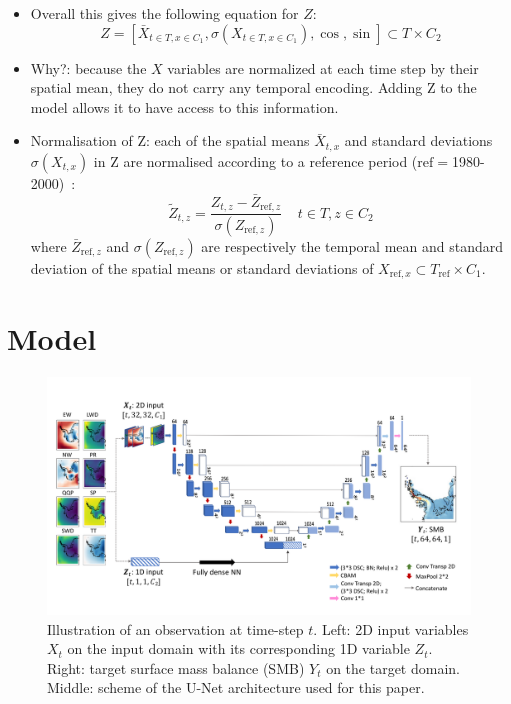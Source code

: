 \documentclass[a4paper,11pt,oneside]{report}
\begin{document}
\begin{itemize}
\begin{itemize}
    \item Overall this gives the following equation for $Z$:
    \begin{equation}\label{eq:Z}
    Z = \left[ \bar{X}_{t\in T, x\in C_1}, \sigma\left(X_{t\in T, x\in C_1}\right), \operatorname{cos}, \operatorname{sin} \right] \subset T \times C_2
\end{equation}
    \item Why?: because the $X$ variables are normalized at each time step by their spatial mean, they do not carry any temporal encoding. Adding Z to the model allows it to have access to this information. 
\item Normalisation of Z: each of the spatial means $\bar{X}_{t,x}$ and standard deviations $\sigma(X_{t,x})$ in Z are normalised according to a reference period ($\mathrm{ref}=$1980-2000)~\cite{Doury}:
\begin{equation}\label{eq:normalisation-Z}
    \tilde{Z}_{t,z} = \frac{Z_{t,z}-\bar{Z}_{\mathrm{\mathrm{ref}},z}}{\sigma(Z_{\mathrm{ref},z})} \;\;\;\; t\in T, z\in C_2
\end{equation}
where $\bar{Z}_{\mathrm{ref},z}$ and $\sigma(Z_{\mathrm{ref},z})$ are respectively the temporal mean and standard deviation of the spatial means or standard deviations of $X_{\mathrm{ref}, x} \subset T_{\mathrm{ref}}\times C_1$.
\end{itemize}



\end{itemize}




\section{Model}\label{sec:model}

\begin{figure}[!t]
  \centering
  \includegraphics[width=\columnwidth]{doc/Thesis-latex/images/unet-with-data.pdf}
  \caption []{\small Illustration of an observation at time-step $t$. Left: 2D input variables $X_t$ on the input domain with its corresponding 1D variable $Z_t$. Right: target surface mass balance (SMB) $Y_t$ on the target domain. Middle: scheme of the U-Net architecture used for this paper. }
  \vspace{-3mm}
  \label{fig:example-features}
\end{figure}
\end{document}

